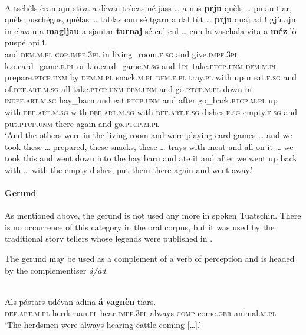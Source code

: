 \ea\label{ex:omit:1}
\\
\gll    A tschèls èran ajn stiva a dèvan tròcas né jass … a nus \textbf{prju} quèls … pinau tiar, quèls puschégns, quèlas … tablas cun sé tgarn a dal tùt … \textbf{prju} quaj ad \textbf{i} gjù ajn in clavau a \textbf{magljau} a sjantar \textbf{turnaj} sé cul cul … cun la vaschala vita a \textbf{méz} lò puspé api \textbf{i}.\\
and \textsc{dem.m.pl} \textsc{cop.impf.3pl} in living\_room.\textsc{f.sg} and give.\textsc{impf.3pl} k.o.card\_game.\textsc{f.pl} or k.o.card\_game.\textsc{m.sg} {} and \textsc{1pl} take.\textsc{ptcp.unm} \textsc{dem.m.pl} {} prepare.\textsc{ptcp.unm} by \textsc{dem.m.pl} snack.\textsc{m.pl}  \textsc{dem.f.pl} {} tray.\textsc{pl} with up meat.\textsc{f.sg} and of.\textsc{def.art.m.sg} all {} take.\textsc{ptcp.unm} \textsc{dem.unm} and go.\textsc{ptcp.m.pl} down in \textsc{indef.art.m.sg} hay\_barn and eat.\textsc{ptcp.unm} and after go\_back.\textsc{ptcp.m.pl} up with.\textsc{def.art.m.sg} with.\textsc{def.art.m.sg} {} with \textsc{def.art.f.sg} dishes.\textsc{f.sg} empty.\textsc{f.sg} and put.\textsc{ptcp.unm} there again and go.\textsc{ptcp.m.pl}\\
\glt `And the others were in the living room and were playing card games … and we took these … prepared, these snacks, these … trays with meat and all on it … we took this and went down into the hay barn and ate it and after we went up back with … with the empty dishes, put them there again and went away.'
\z

\paragraph{Gerund}

As mentioned above, the gerund is not used any more in spoken Tuatschin. There is no occurrence of this category in the oral corpus, but it was used by the traditional story tellers whose legends were published in \citet{Büchli1966}.

The gerund may be used as a complement of a verb of perception and is headed by the complementiser \textit{á/ád}. 

\ea\label{}
 {\citealt[53]{Büchli1966}}\\
\gll    Als pástars udévan adina \textbf{á} \textbf{vagnèn} tiars.\\
   \textsc{def.art.m.pl} herdsman.\textsc{pl} hear.\textsc{impf.3pl} always \textsc{comp} come.\textsc{ger}  animal.\textsc{m.pl}\\
\glt `The herdsmen were always hearing cattle coming […].'
\z

